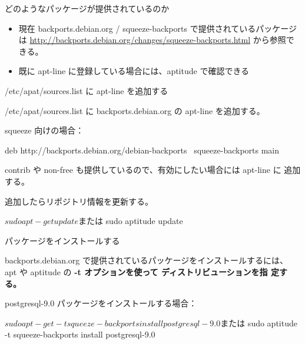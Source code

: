 
\begin{frame}[containsverbatim]{どのようなパッケージが提供されているのか}
\begin{itemize}
\item 現在 backports.debian.org / squeeze-backports で提供されているパッケージは
\url{http://backports.debian.org/changes/squeeze-backports.html}
から参照できる。

\item 既に apt-line に登録している場合には、aptitude で確認できる

\end{itemize}



\end{frame}

\begin{frame}[containsverbatim]{/etc/apat/sources.list に apt-line を追加する}

/etc/apat/sources.list に backports.debian.org の apt-line を追加する。

squeeze 向けの場合：
\begin{commandline}
deb http://backports.debian.org/debian-backports \
     squeeze-backports main
\end{commandline}

contrib や non-free も提供しているので、有効にしたい場合には apt-line に
追加する。

\end{frame}

\begin{frame}[containsverbatim]

追加したらリポジトリ情報を更新する。

\begin{commandline}
$ sudo apt-get update
または
$ sudo aptitude update
\end{commandline}
\end{frame}

\begin{frame}[containsverbatim]{パッケージをインストールする}

backports.debian.org で提供されているパッケージをインストールするには、
apt や aptitude の \bf{-t} オプションを使って ディストリビューションを指
定する。

postgresql-9.0 パッケージをインストールする場合：
\begin{commandline}
$ sudo apt-get -t squeeze-backports install postgresql-9.0
または
$ sudo aptitude -t squeeze-backports install postgresql-9.0
\end{commandline}

\end{frame}


